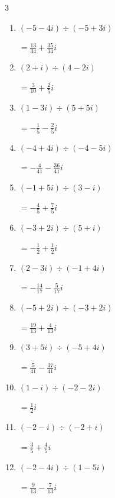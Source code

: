 \begin{multicols}{3}
\begin{enumerate}
  \item $\displaystyle (-5-4i)\div(-5+3i)$

        $\displaystyle =\frac{13}{34}+\frac{35}{34}i$

  \item $\displaystyle (2+i)\div(4-2i)$

        $\displaystyle =\frac{3}{10}+\frac{2}{5}i$

  \item $\displaystyle (1-3i)\div(5+5i)$

        $\displaystyle =-\frac{1}{5}-\frac{2}{5}i$

  \item $\displaystyle (-4+4i)\div(-4-5i)$

        $\displaystyle =-\frac{4}{41}-\frac{36}{41}i$

  \item $\displaystyle (-1+5i)\div(3-i)$

        $\displaystyle =-\frac{4}{5}+\frac{7}{5}i$

  \item $\displaystyle (-3+2i)\div(5+i)$

        $\displaystyle =-\frac{1}{2}+\frac{1}{2}i$

  \item $\displaystyle (2-3i)\div(-1+4i)$

        $\displaystyle =-\frac{14}{17}-\frac{5}{17}i$

\columnbreak %

\resetques

  \item $\displaystyle (-5+2i)\div(-3+2i)$

        $\displaystyle =\frac{19}{13}+\frac{4}{13}i$

  \item $\displaystyle (3+5i)\div(-5+4i)$

        $\displaystyle =\frac{5}{41}-\frac{37}{41}i$

  \item $\displaystyle (1-i)\div(-2-2i)$

        $\displaystyle =\frac{1}{2}i$

  \item $\displaystyle (-2-i)\div(-2+i)$

        $\displaystyle =\frac{3}{5}+\frac{4}{5}i$

  \item $\displaystyle (-2-4i)\div(1-5i)$

        $\displaystyle =\frac{9}{13}-\frac{7}{13}i$


\end{enumerate}
\end{multicols}
